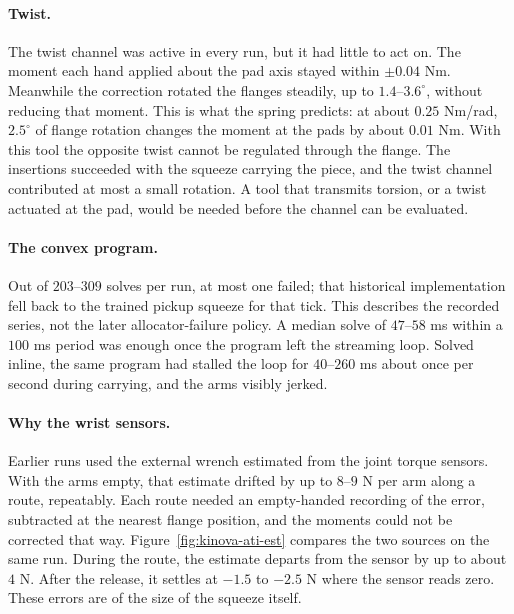 \paragraph{Twist.} The twist channel was active in every run, but it had little to act on. The moment each hand applied about the pad axis stayed within $\pm0.04$ Nm. Meanwhile the correction rotated the flanges steadily, up to $1.4$--$3.6^\circ$, without reducing that moment. This is what the spring predicts: at about $0.25$ Nm/rad, $2.5^\circ$ of flange rotation changes the moment at the pads by about $0.01$ Nm. With this tool the opposite twist cannot be regulated through the flange. The insertions succeeded with the squeeze carrying the piece, and the twist channel contributed at most a small rotation. A tool that transmits torsion, or a twist actuated at the pad, would be needed before the channel can be evaluated.

\paragraph{The convex program.} Out of $203$--$309$ solves per run, at most one failed; that historical implementation fell back to the trained pickup squeeze for that tick. This describes the recorded series, not the later allocator-failure policy. A median solve of $47$--$58$ ms within a $100$ ms period was enough once the program left the streaming loop. Solved inline, the same program had stalled the loop for $40$--$260$ ms about once per second during carrying, and the arms visibly jerked.

\paragraph{Why the wrist sensors.} Earlier runs used the external wrench estimated from the joint torque sensors. With the arms empty, that estimate drifted by up to $8$--$9$ N per arm along a route, repeatably. Each route needed an empty-handed recording of the error, subtracted at the nearest flange position, and the moments could not be corrected that way. Figure~\ref{fig:kinova-ati-est} compares the two sources on the same run. During the route, the estimate departs from the sensor by up to about $4$ N. After the release, it settles at $-1.5$ to $-2.5$ N where the sensor reads zero. These errors are of the size of the squeeze itself.


